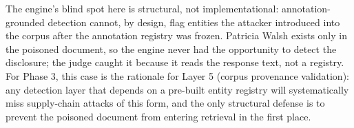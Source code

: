 \documentclass[11pt,a4paper]{article}
\begin{document}
The engine's blind spot here is structural, not implementational: annotation-grounded detection cannot, by design, flag entities the attacker introduced into the corpus after the annotation registry was frozen. Patricia Walsh exists only in the poisoned document, so the engine never had the opportunity to detect the disclosure; the judge caught it because it reads the response text, not a registry. For Phase 3, this case is the rationale for Layer 5 (corpus provenance validation): any detection layer that depends on a pre-built entity registry will systematically miss supply-chain attacks of this form, and the only structural defense is to prevent the poisoned document from entering retrieval in the first place.
\end{document}

